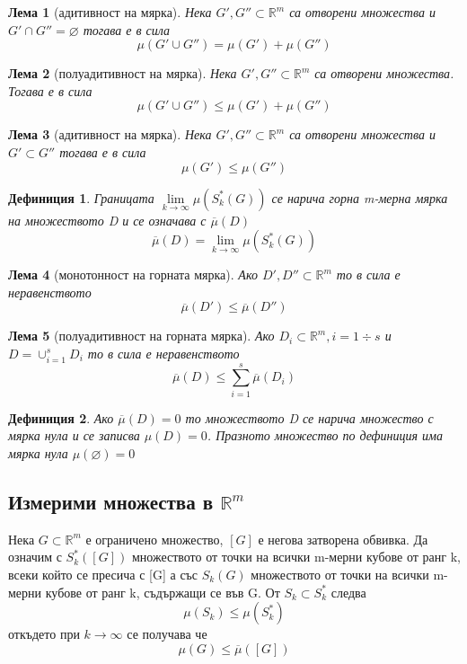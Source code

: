 \documentclass[a4paper,fleqn,12pt]{article}
\newtheorem{lemma}{Лема}[subsection]
\newtheorem{definition}{Дефиниция}[subsection]
\theoremstyle{definition}
\begin{document}
\begin{lemma}[адитивност на мярка]
Нека $G', G'' \subset \mathbb{R}^m$ са отворени множества и $G' \cap G'' = \varnothing$ тогава е в сила
$$\mu (G' \cup G'') = \mu(G') + \mu(G'')$$
\end{lemma}

\begin{lemma}[полуадитивност на мярка]
Нека $G', G'' \subset \mathbb{R}^m$ са отворени множества. Тогава е в сила
$$\mu (G' \cup G'') \leq \mu(G') + \mu(G'')$$
\end{lemma}

\begin{lemma}[адитивност на мярка]
Нека $G', G'' \subset \mathbb{R}^m$ са отворени множества и $G' \subset G''$ тогава е в сила
$$ \mu(G') \leq \mu(G'')$$
\end{lemma}

\begin{definition}
Границата $\lim\limits_{k \to \infty} \mu(S_k ^*(G))$ се нарича горна m-мерна мярка на множеството D и се означава с $\overline{\mu}(D)$
$$\overline{\mu}(D) = \lim\limits_{k \to \infty} \mu(S_k ^*(G))$$
\end{definition}

\begin{lemma}[монотонност на горната мярка]
Ако $D',D'' \subset \mathbb{R}^m$ то в сила е неравенството
$$\overline{\mu}(D') \leq \overline{\mu}(D'')$$
\end{lemma}

\begin{lemma}[полуадитивност на горната мярка]
Ако $D_i \subset \mathbb{R}^m, i = 1 \div s$ и $D = \cup_{i =1} ^s D_i$ то в сила е неравенството
$$\overline{\mu}(D) \leq \sum_{i=1}^s \overline{\mu}(D_i)$$ 
\end{lemma}

\begin{definition}
Ако $\overline{\mu}(D) = 0$ то множеството D се нарича множество с мярка нула и се записва $\mu(D) = 0$. Празното множество по дефиниция има мярка нула $\mu(\varnothing) = 0$
\end{definition}

\subsection{Измерими множества в $\mathbb{R}^m$}
Нека $G \subset \mathbb{R}^m$ е ограничено множество, $[G]$ е негова затворена обвивка. Да означим с $S_k ^* ([G])$ множеството от точки на всички m-мерни кубове от ранг k, всеки който се пресича с [G] а със $S_k (G)$ множеството от точки на всички m-мерни кубове от ранг k, съдържащи се във G. От $S_k \subset S_k ^*$ следва 
$$\mu(S_k) \leq \mu(S_k ^*)$$
откъдето при $k \to \infty$ се получава че
$$\mu(G) \leq \overline{\mu}([G])$$
\end{document}

